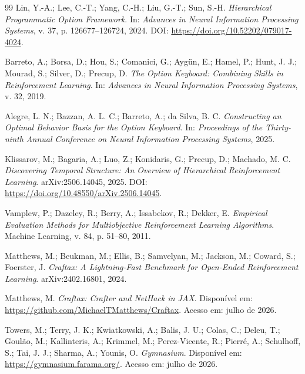 \begin{thebibliography}{99}
Lin, Y.-A.; Lee, C.-T.; Yang, C.-H.; Liu, G.-T.; Sun, S.-H.
\textit{Hierarchical Programmatic Option Framework}.
In: \textit{Advances in Neural Information Processing Systems}, v. 37,
p. 126677--126724, 2024.
DOI: \url{https://doi.org/10.52202/079017-4024}.

Barreto, A.; Borsa, D.; Hou, S.; Comanici, G.; Aygün, E.;
Hamel, P.; Hunt, J. J.; Mourad, S.; Silver, D.; Precup, D.
\textit{The Option Keyboard: Combining Skills in Reinforcement Learning}.
In: \textit{Advances in Neural Information Processing Systems},
v. 32, 2019.

Alegre, L. N.; Bazzan, A. L. C.; Barreto, A.; da Silva, B. C.
\textit{Constructing an Optimal Behavior Basis for the Option Keyboard}.
In: \textit{Proceedings of the Thirty-ninth Annual Conference on Neural
Information Processing Systems}, 2025.

Klissarov, M.; Bagaria, A.; Luo, Z.; Konidaris, G.; Precup, D.;
Machado, M. C.
\textit{Discovering Temporal Structure: An Overview of Hierarchical
Reinforcement Learning}.
arXiv:2506.14045, 2025.
DOI: \url{https://doi.org/10.48550/arXiv.2506.14045}.

Vamplew, P.; Dazeley, R.; Berry, A.; Issabekov, R.; Dekker, E.
\textit{Empirical Evaluation Methods for Multiobjective Reinforcement
Learning Algorithms}.
Machine Learning, v. 84, p. 51--80, 2011.

Matthews, M.; Beukman, M.; Ellis, B.; Samvelyan, M.; Jackson, M.; Coward, S.;
Foerster, J.
\textit{Craftax: A Lightning-Fast Benchmark for Open-Ended Reinforcement
Learning}.
arXiv:2402.16801, 2024.

Matthews, M.
\textit{Craftax: Crafter and NetHack in JAX}.
Disponível em: \url{https://github.com/MichaelTMatthews/Craftax}.
Acesso em: julho de 2026.

Towers, M.; Terry, J. K.; Kwiatkowski, A.; Balis, J. U.;
Colas, C.; Deleu, T.; Goulão, M.; Kallinteris, A.; Krimmel, M.;
Perez-Vicente, R.; Pierré, A.; Schulhoff, S.; Tai, J. J.;
Sharma, A.; Younis, O.
\textit{Gymnasium}.
Disponível em: \url{https://gymnasium.farama.org/}.
Acesso em: julho de 2026.

\end{thebibliography}
